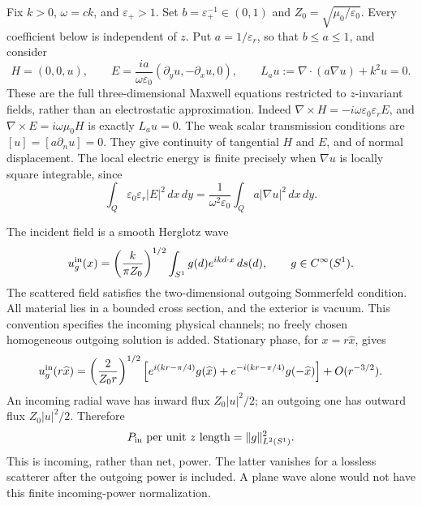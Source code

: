 Fix $k>0$, $\omega=ck$, and $\varepsilon_+>1$.  Set
$b=\varepsilon_+^{-1}\in(0,1)$ and $Z_0=\sqrt{\mu_0/\varepsilon_0}$.
Every coefficient below is independent of $z$.  Put $a=1/\varepsilon_r$,
so that $b\leq a\leq1$, and consider
\begin{equation}
 H=(0,0,u),\qquad
 E=\frac{ia}{\omega\varepsilon_0}(\partial_yu,-\partial_xu,0),
 \qquad L_a u:=\nabla\cdot(a\nabla u)+k^2u=0.
 \label{hs:tm}
\end{equation}
These are the full three-dimensional Maxwell equations restricted to
$z$-invariant fields, rather than an electrostatic approximation.
Indeed $\nabla\times H=-i\omega\varepsilon_0\varepsilon_rE$, and
$\nabla\times E=i\omega\mu_0H$ is exactly $L_au=0$.
The weak scalar transmission conditions are $[u]=[a\partial_nu]=0$.
They give continuity of tangential $H$ and $E$, and of normal displacement.
The local electric energy is finite precisely when $\nabla u$ is locally
square integrable, since
\begin{equation}
 \int_Q\varepsilon_0\varepsilon_r|E|^2\,dx\,dy
 =\frac{1}{\omega^2\varepsilon_0}\int_Q a|\nabla u|^2\,dx\,dy.
 \label{hs:energy}
\end{equation}

The incident field is a smooth Herglotz wave
\begin{equation}
 u_g^{\rm in}(x)=\left(\frac{k}{\pi Z_0}\right)^{1/2}
   \int_{S^1}g(d)e^{ikd\cdot x}\,ds(d),\qquad g\in C^\infty(S^1).
 \label{hs:herglotz}
\end{equation}
The scattered field satisfies the two-dimensional outgoing Sommerfeld
condition.  All material lies in a bounded cross section, and the exterior
is vacuum.  This convention specifies the incoming physical channels;
no freely chosen homogeneous outgoing solution is added.
Stationary phase, for $x=r\widehat x$, gives
\begin{equation}
 u_g^{\rm in}(r\widehat x)=
 \left(\frac{2}{Z_0r}\right)^{1/2}
 \left[e^{i(kr-\pi/4)}g(\widehat x)
       +e^{-i(kr-\pi/4)}g(-\widehat x)\right]+O(r^{-3/2}).
 \label{hs:asymptotic-input}
\end{equation}
An incoming radial wave has inward flux $Z_0|u|^2/2$; an outgoing
one has outward flux $Z_0|u|^2/2$.  Therefore
\begin{equation}
 P_{\rm in}\text{ per unit }z\text{ length}=\|g\|_{L^2(S^1)}^2.
 \label{hs:power}
\end{equation}
This is incoming, rather than net, power.  The latter vanishes for a lossless
scatterer after the outgoing power is included.  A plane wave alone would
not have this finite incoming-power normalization.

